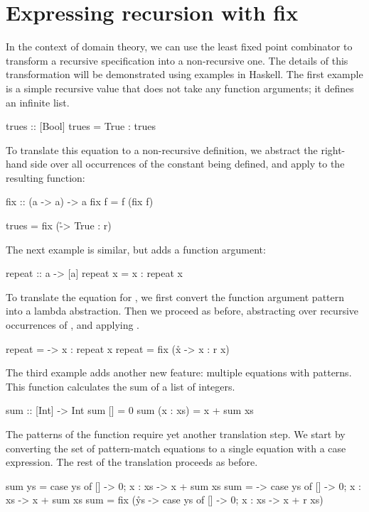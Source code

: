 \section{Expressing recursion with fix}
\label{sec:fixrec-fix}

In the context of domain theory, we can use the least fixed point combinator to transform a recursive specification into a non-recursive one. The details of this transformation will be demonstrated using examples in Haskell. The first example is a simple recursive value that does not take any function arguments; it defines an infinite list.
%
\begin{hscode}
trues :: [Bool]
trues = True : trues
\end{hscode}
%
To translate this equation to a non-recursive definition, we abstract the right-hand side over all occurrences of the constant being defined, and apply  to the resulting function:
%
\begin{hscode}
fix :: (a -> a) -> a
fix f = f (fix f)
\end{hscode}
\begin{hscode}
trues = fix (\r -> True : r)
\end{hscode}
%
The next example is similar, but adds a function argument:
\begin{hscode}
repeat :: a -> [a]
repeat x = x : repeat x
\end{hscode}
%
To translate the equation for , we first convert the function argument pattern into a lambda abstraction. Then we proceed as before, abstracting over recursive occurrences of , and applying .
%
\begin{hscode}
repeat = \x -> x : repeat x
repeat = fix (\r x -> x : r x)
\end{hscode}
%
The third example adds another new feature: multiple equations with patterns. This function calculates the sum of a list of integers.
%
\begin{hscode}
sum :: [Int] -> Int
sum [] = 0
sum (x : xs) = x + sum xs
\end{hscode}
%
The patterns of the  function require yet another translation step. We start by converting the set of pattern-match equations to a single equation with a case expression. The rest of the translation proceeds as before.
%
\begin{hscode}
sum ys = case ys of [] -> 0; x : xs -> x + sum xs
sum = \ys -> case ys of [] -> 0; x : xs -> x + sum xs
sum = fix (\r ys -> case ys of [] -> 0; x : xs -> x + r xs)
\end{hscode}
